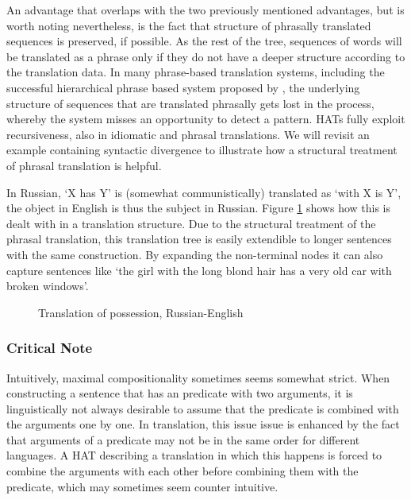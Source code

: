 An advantage that overlaps with the two previously mentioned advantages, but is worth noting nevertheless, is the fact that structure of phrasally translated sequences is preserved, if possible. As the rest of the tree, sequences of words will be translated as a phrase only if they do not have a deeper structure according to the translation data. In many phrase-based translation systems, including the successful hierarchical phrase based system proposed by \cite{chiang2007hierarchical}, the underlying structure of sequences that are translated phrasally gets lost in the process, whereby the system misses an opportunity to detect a pattern. HATs fully exploit recursiveness, also in idiomatic and phrasal translations. We will revisit an example containing syntactic divergence to illustrate how a structural treatment of phrasal translation is helpful.

In Russian, `X has Y' is (somewhat communistically) translated as `with X is Y', the object in English is thus the subject in Russian. Figure \ref{fig:russian1} shows how this is dealt with in a translation structure. Due to the structural treatment of the phrasal translation, this translation tree is easily extendible to longer sentences with the same construction. By expanding the non-terminal nodes it can also capture sentences like `the girl with the long blond hair has a very old car with broken windows'.

\begin{figure}[!ht]
\centering

\caption{Translation of possession, Russian-English}\label{fig:russian1}
\end{figure}


\subsubsection{Critical Note}

Intuitively, maximal compositionality sometimes seems somewhat strict. When constructing a sentence that has an predicate with two arguments, it is linguistically not always desirable to assume that the predicate is combined with the arguments one by one. In translation, this issue issue is enhanced by the fact that arguments of a predicate may not be in the same order for different languages. A HAT describing a translation in which this happens is forced to combine the arguments with each other before combining them with the predicate, which may sometimes seem counter intuitive.



